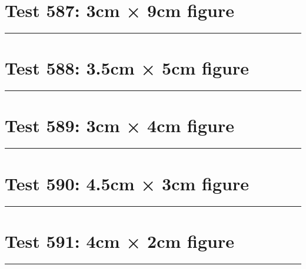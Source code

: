 \documentclass[a4paper,11pt]{article}
\begin{document}
\section*{Test 587: 3cm × 9cm figure}
\begin{swarmwrap}%
  \begin{minipage}[t]{3cm}
    \centering
    \rule{\linewidth}{9cm}
  \end{minipage}%
\end{swarmwrap}%
\swarmwrapnext
\lipsum[138]
\lipsum[139]
\lipsum[140]
\lipsum[141]
\lipsum[142]
\lipsum[143]
\section*{Test 588: 3.5cm × 5cm figure}
\begin{swarmwrap}%
  \begin{minipage}[t]{3cm}
    \centering
    \rule{\linewidth}{5cm}
  \end{minipage}%
\end{swarmwrap}%
\swarmwrapnext
\lipsum[119]
\lipsum[120]
\lipsum[121]
\lipsum[122]
\section*{Test 589: 3cm × 4cm figure}
\begin{swarmwrap}%
  \begin{minipage}[t]{3cm}
    \centering
    \rule{\linewidth}{4cm}
  \end{minipage}%
\end{swarmwrap}%
\swarmwrapnext
\lipsum[50]
\lipsum[51]
\lipsum[52]
\lipsum[53]
\lipsum[54]
\section*{Test 590: 4.5cm × 3cm figure}
\begin{swarmwrap}%
  \begin{minipage}[t]{4cm}
    \centering
    \rule{\linewidth}{3cm}
  \end{minipage}%
\end{swarmwrap}%
\swarmwrapnext
\lipsum[109]
\lipsum[110]
\lipsum[111]
\section*{Test 591: 4cm × 2cm figure}
\begin{swarmwrap}%
  \begin{minipage}[t]{4cm}
    \centering
    \rule{\linewidth}{2cm}
  \end{minipage}%
\end{swarmwrap}%
\swarmwrapnext
\lipsum[54]
\lipsum[55]
\lipsum[56]
\lipsum[57]
\end{document}
